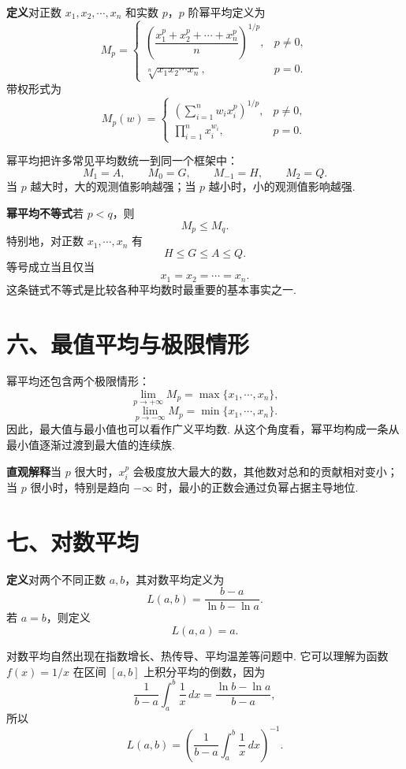 \documentclass[UTF8, 12pt, fontset=fandol, oneside]{ctexart}
\begin{document}
\noindent\textbf{定义}\quad 对正数 $x_1,x_2,\cdots,x_n$ 和实数 $p$，$p$ 阶幂平均定义为
\[
  M_p=
  \begin{cases}
    \left(\dfrac{x_1^p+x_2^p+\cdots+x_n^p}{n}\right)^{1/p}, & p\ne0,\\[1.2em]
    \sqrt[n]{x_1x_2\cdots x_n}, & p=0.
  \end{cases}
\]
带权形式为
\[
  M_p(w)=
  \begin{cases}
    \left(\displaystyle\sum_{i=1}^n w_i x_i^p\right)^{1/p}, & p\ne0,\\[1.2em]
    \displaystyle\prod_{i=1}^n x_i^{w_i}, & p=0.
  \end{cases}
\]

幂平均把许多常见平均数统一到同一个框架中：
\[
  M_1=A,\qquad M_0=G,\qquad M_{-1}=H,\qquad M_2=Q.
\]
当 $p$ 越大时，大的观测值影响越强；当 $p$ 越小时，小的观测值影响越强.

\noindent\textbf{幂平均不等式}\quad 若 $p<q$，则
\[
  M_p\le M_q.
\]
特别地，对正数 $x_1,\cdots,x_n$ 有
\[
  H\le G\le A\le Q.
\]
等号成立当且仅当
\[
  x_1=x_2=\cdots=x_n.
\]
这条链式不等式是比较各种平均数时最重要的基本事实之一.

\section*{六、最值平均与极限情形}

幂平均还包含两个极限情形：
\[
  \lim_{p\to+\infty}M_p=\max\{x_1,\cdots,x_n\},
\]
\[
  \lim_{p\to-\infty}M_p=\min\{x_1,\cdots,x_n\}.
\]
因此，最大值与最小值也可以看作广义平均数. 从这个角度看，幂平均构成一条从最小值逐渐过渡到最大值的连续族.

\noindent\textbf{直观解释}\quad 当 $p$ 很大时，$x_i^p$ 会极度放大最大的数，其他数对总和的贡献相对变小；当 $p$ 很小时，特别是趋向 $-\infty$ 时，最小的正数会通过负幂占据主导地位.

\section*{七、对数平均}

\noindent\textbf{定义}\quad 对两个不同正数 $a,b$，其对数平均定义为
\[
  L(a,b)=\frac{b-a}{\ln b-\ln a}.
\]
若 $a=b$，则定义
\[
  L(a,a)=a.
\]

对数平均自然出现在指数增长、热传导、平均温差等问题中. 它可以理解为函数 $f(x)=1/x$ 在区间 $[a,b]$ 上积分平均的倒数，因为
\[
  \frac{1}{b-a}\int_a^b \frac{1}{x}\,dx
  =\frac{\ln b-\ln a}{b-a},
\]
所以
\[
  L(a,b)=
  \left(
    \frac{1}{b-a}\int_a^b \frac{1}{x}\,dx
  \right)^{-1}.
\]
\end{document}
